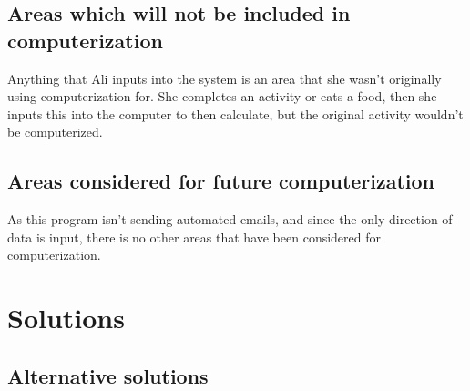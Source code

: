 \subsection{Areas which will not be included in computerization}
Anything that Ali inputs into the system is an area that she wasn't originally using computerization for. She completes an activity or eats a food, then she inputs this into the computer to then calculate, but the original activity wouldn't be computerized.

\subsection{Areas considered for future computerization}
As this program isn't sending automated emails, and since the only direction of data is input, there is no other areas that have been considered for computerization.


\section{Solutions}

\subsection{Alternative solutions}

